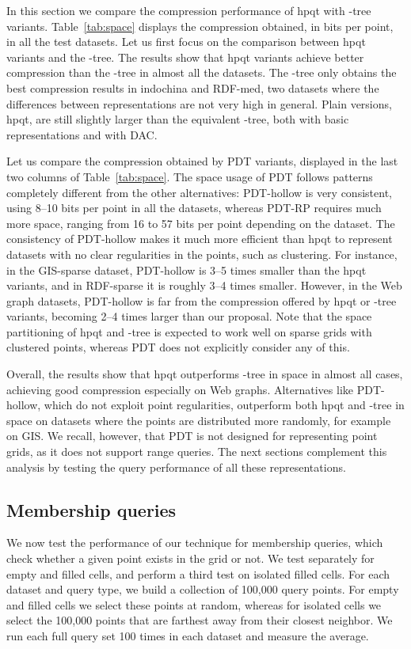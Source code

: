 \documentclass{elsarticle}
\newcommand{\kt}{-tree\xspace}
\newcommand{\indo}{\textsf{indochina}\xspace}
\newcommand{\giss}{\textsf{GIS-sparse}\xspace}
\newcommand{\rdfs}{\textsf{RDF-sparse}\xspace}
\newcommand{\rdfm}{\textsf{RDF-med}\xspace}
\newcommand{\hpqt}{\textsf{hpqt}\xspace}
\newcommand{\hpqtp}{\textsf{hpqt}\xspace}
\newcommand{\hpqtR}{\textsf{hpqt}\xspace}
\newcommand{\pdt}{PDT\xspace}
\newcommand{\pdth}{PDT-hollow\xspace}
\newcommand{\pdtrp}{PDT-RP\xspace}
\begin{document}
In this section we compare the compression performance of \hpqt with \kt variants. Table~\ref{tab:space} displays the compression obtained, in bits per point, in all the test datasets. Let us first focus on the comparison between \hpqt variants and the \kt. The results show that \hpqtR variants achieve better compression than the \kt in almost all the datasets. The \kt only obtains the best compression results in \indo and \rdfm, two datasets where the differences between representations are not very high in general. Plain versions, \hpqtp, are still slightly larger than the equivalent \kt, both with basic representations and with DAC. 

Let us compare the compression obtained by \pdt variants, displayed in the last two columns of Table~\ref{tab:space}. The space usage of \pdt follows patterns completely different from the other alternatives: \pdth is very consistent, using 8--10 bits per point in all the datasets, whereas \pdtrp requires much more space, ranging from 16 to 57 bits per point depending on the dataset. The consistency of \pdth makes it much more efficient than \hpqt to represent datasets with no clear regularities in the points, such as clustering. For instance, in the \giss dataset, \pdth is 3--5 times smaller than the \hpqt variants, and in \rdfs it is roughly 3--4 times smaller. However, in the Web graph datasets, \pdth is far from the compression offered by \hpqt or \kt variants, becoming 2--4 times larger than our proposal. Note that the space partitioning of \hpqt and \kt is expected to work well on sparse grids with clustered points, whereas \pdt does not explicitly consider any of this. 
 
 
Overall, the results show that \hpqt outperforms \kt in space in almost all cases, achieving good compression especially on Web graphs. Alternatives like \pdth, which do not exploit point regularities, outperform both \hpqt and \kt in space on datasets where the points are distributed more randomly, for example on GIS. We recall, however, that \pdt is not designed for representing point grids, as it does not support range queries. The next sections complement this analysis by testing the query performance of all these representations.

\subsection{Membership queries}

We now test the performance of our technique for membership queries, which check whether a given point exists in the grid or not. We test separately for empty and filled cells, and perform a third test on isolated filled cells. For each dataset and query type, we build a collection of 100,000 query points. For empty and filled cells we select these points at random, whereas for isolated cells we select the 100,000 points that are farthest away from their closest neighbor. We run each full query set 100 times in each dataset and measure the average.
\end{document}
